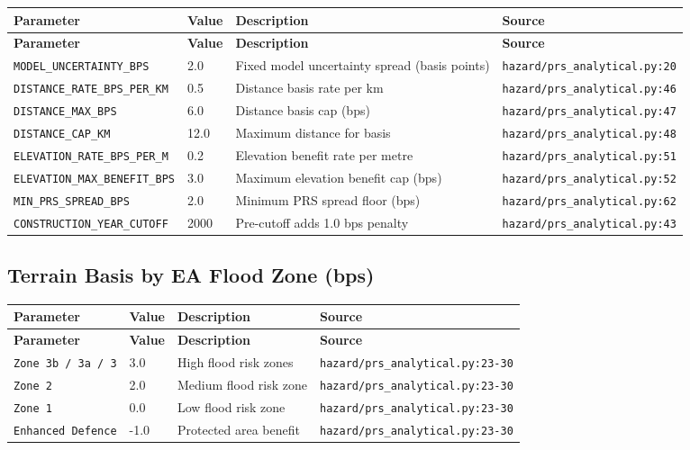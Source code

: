 \documentclass[11pt,a4paper]{article}
\begin{document}
\begin{longtable}{p{4cm}p{4cm}p{5.5cm}p{3.5cm}}
    \toprule
    \textbf{Parameter} & \textbf{Value} & \textbf{Description} & \textbf{Source} \\
    \midrule
    \endfirsthead
    \toprule
    \textbf{Parameter} & \textbf{Value} & \textbf{Description} & \textbf{Source} \\
    \midrule
    \endhead
    \bottomrule
    \endfoot
    \texttt{MODEL\_UNCERTAINTY\_BPS} & 2.0 & Fixed model uncertainty spread (basis points) & {\scriptsize \texttt{hazard/prs\_analytical.py:20}} \\
    \texttt{DISTANCE\_RATE\_BPS\_PER\_KM} & 0.5 & Distance basis rate per km & {\scriptsize \texttt{hazard/prs\_analytical.py:46}} \\
    \texttt{DISTANCE\_MAX\_BPS} & 6.0 & Distance basis cap (bps) & {\scriptsize \texttt{hazard/prs\_analytical.py:47}} \\
    \texttt{DISTANCE\_CAP\_KM} & 12.0 & Maximum distance for basis & {\scriptsize \texttt{hazard/prs\_analytical.py:48}} \\
    \texttt{ELEVATION\_RATE\_BPS\_PER\_M} & 0.2 & Elevation benefit rate per metre & {\scriptsize \texttt{hazard/prs\_analytical.py:51}} \\
    \texttt{ELEVATION\_MAX\_BENEFIT\_BPS} & 3.0 & Maximum elevation benefit cap (bps) & {\scriptsize \texttt{hazard/prs\_analytical.py:52}} \\
    \texttt{MIN\_PRS\_SPREAD\_BPS} & 2.0 & Minimum PRS spread floor (bps) & {\scriptsize \texttt{hazard/prs\_analytical.py:62}} \\
    \texttt{CONSTRUCTION\_YEAR\_CUTOFF} & 2000 & Pre-cutoff adds 1.0 bps penalty & {\scriptsize \texttt{hazard/prs\_analytical.py:43}} \\
\end{longtable}

\subsection{Terrain Basis by EA Flood Zone (bps)}

\begin{longtable}{p{4cm}p{4cm}p{5.5cm}p{3.5cm}}
    \toprule
    \textbf{Parameter} & \textbf{Value} & \textbf{Description} & \textbf{Source} \\
    \midrule
    \endfirsthead
    \toprule
    \textbf{Parameter} & \textbf{Value} & \textbf{Description} & \textbf{Source} \\
    \midrule
    \endhead
    \bottomrule
    \endfoot
    \texttt{Zone 3b / 3a / 3} & 3.0 & High flood risk zones & {\scriptsize \texttt{hazard/prs\_analytical.py:23-30}} \\
    \texttt{Zone 2} & 2.0 & Medium flood risk zone & {\scriptsize \texttt{hazard/prs\_analytical.py:23-30}} \\
    \texttt{Zone 1} & 0.0 & Low flood risk zone & {\scriptsize \texttt{hazard/prs\_analytical.py:23-30}} \\
    \texttt{Enhanced Defence} & -1.0 & Protected area benefit & {\scriptsize \texttt{hazard/prs\_analytical.py:23-30}} \\
\end{longtable}
\end{document}
